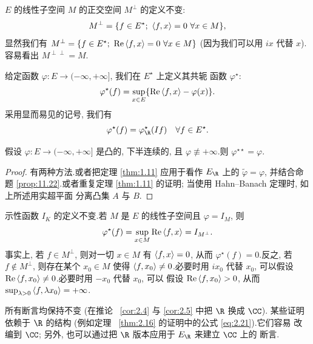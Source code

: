 $E$ 的线性子空间 $M$ 的正交空间 $M^\perp$ 的定义不变:
\begin{equation*}
M^\perp=\{f\in E^\star;\ \dual{f}{x}=0\ \forall x\in M\},
\end{equation*}
显然我们有 $M^\perp=\{f\in E^\star;\ \operatorname{Re}\dual{f}{x}=0\
\forall x\in M\}$ (因为我们可以用 $ix$ 代替 $x$).容易看出 $M^{\perp\perp}=M$.

给定函数 $\varphi:E\to(-\infty,+\infty]$, 我们在 $E^\star$ 上定义其共轭
函数 $\varphi^\star$:
\begin{equation*}
\varphi^\star(f)=\sup_{x\in E}\{\operatorname{Re}\left\langle f,x\right\rangle-\varphi(x)\}.
\end{equation*}
采用显而易见的记号, 我们有
\begin{equation*}
\varphi^\star(f)=\varphi^\star_\R(If)\quad\forall f\in E^\star.
\end{equation*}

\begin{proposition}
\label{prop:11.25}
假设 $\varphi:E\to(-\infty,+\infty]$ 是凸的, 下半连续的, 且
$\varphi\not\equiv+\infty$.则 $\varphi^{\star\star}=\varphi$.
\end{proposition}

\begin{proof}
有两种方法.或者把定理  \ref{thm:1.11} 应用于看作 $E_\R$ 上的
$\tilde\varphi=\varphi$, 并结合命题  \ref{prop:11.22}.或者重复定理
 \ref{thm:1.11} 的证明; 当使用 Hahn--Banach 定理时, 如上所述用实超平面
分离凸集 $A$ 与 $B$.
\end{proof}

示性函数 $I_K$ 的定义不变.若 $M$ 是 $E$ 的线性子空间且 $\varphi=I_M$, 则
\begin{equation*}
\varphi^\star(f)=\sup_{x\in M}\operatorname{Re}\left\langle f,x\right\rangle=I_{M^\perp}.
\end{equation*}
事实上, 若 $f\in M^\perp$, 则对一切 $x\in M$ 有 $\left\langle f,x\right\rangle=0$, 从而
$\varphi^\star(f)=0$.反之, 若 $f\notin M^\perp$, 则存在某个 $x_0\in M$
使得 $\left\langle f,x_0\right\rangle\ne0$.必要时用 $ix_0$ 代替 $x_0$, 可以假设
$\operatorname{Re}\left\langle f,x_0\right\rangle\ne0$.必要时用 $-x_0$ 代替 $x_0$, 可以
假设 $\operatorname{Re}\left\langle f,x_0\right\rangle>0$, 从而
$\sup_{\lambda>0}\left\langle f,\lambda x_0\right\rangle=+\infty$.

 所有断言均保持不变 (在推论~
\ref{cor:2.4} 与 \ref{cor:2.5} 中把 $\R$ 换成 $\CC$).
某些证明依赖于 $\R$ 的结构 (例如定理~
\ref{thm:2.16} 的证明中的公式 \eqref{eq:2.21}).它们容易
改编到 $\CC$; 另外, 也可以通过把 $\R$ 版本应用于 $E_\R$ 来建立 $\CC$ 上的
断言.

